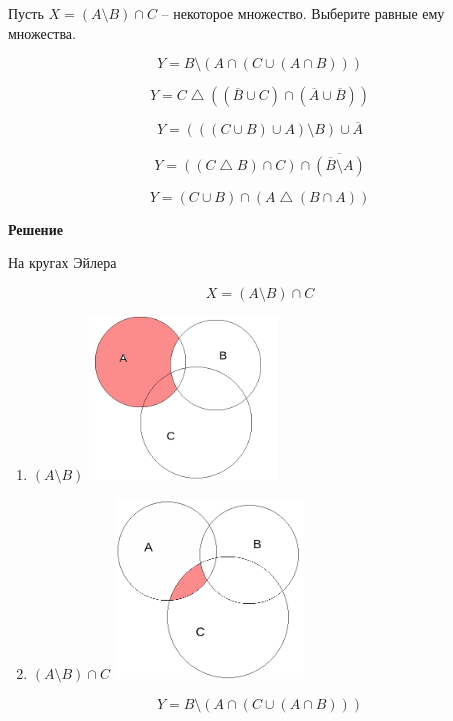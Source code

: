 \documentclass{article}
\begin{document}
Пусть $X= (A \setminus B) \cap C$  – некоторое множество. Выберите равные ему множества.

$$ Y = B \setminus (A \cap (C \cup (A \cap B)))$$

$$Y = C \bigtriangleup ((\overline{B} \cup C) \cap (\overline{A} \cup \overline{B}))$$

$$Y = (((C \cup B) \cup A) \setminus B) \cup \overline{A}$$

$$Y = ((C \bigtriangleup B) \cap C) \cap \overline{(\overline{B} \setminus A)}$$


$$Y = (C \cup B) \cap (A \bigtriangleup (B \cap A))$$


\textbf{Решение}

На кругах Эйлера

$$X= (A \setminus B) \cap C$$

\begin{enumerate}
    \item $(A \setminus B)$
    \includegraphics[width=50mm]{1.png}
    
    \item $(A \setminus B) \cap C$
    \includegraphics[width=50mm]{2.png}
\end{enumerate}

\noindent\makebox[\linewidth]{\rule{\paperwidth}{0.4pt}}

$$ Y = B \setminus (A \cap (C \cup (A \cap B)))$$
\end{document}
